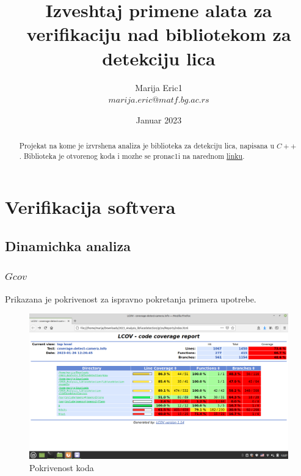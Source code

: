 \documentclass{article}
\title{Izveshtaj primene alata za verifikaciju nad bibliotekom za detekciju lica}
\author{Marija Eric1 \\ 
$marija.eric@matf.bg.ac.rs$}
\date{Januar 2023}
\begin{document}
\maketitle
\renewcommand{\abstractname}{Sazhetak}
\renewcommand*\contentsname{Sadrzhaj}



\begin{abstract}
Projekat na kome je izvrshena analiza je biblioteka za detekciju lica, napisana u $C++$. Biblioteka je otvorenog koda i mozhe se pronac1i na narednom \href{https://github.com/ShiqiYu/libfacedetection}{linku}. 

\end{abstract}
\tableofcontents
\newpage

\section{Verifikacija softvera}
\subsection{Dinamichka analiza}
\subsubsection{$Gcov$}

Prikazana je pokrivenost za ispravno pokretanja primera upotrebe.

\begin{figure}[H]
    \centering
    \includegraphics[width=12cm]{img/gcov/gcovCoverageDetect.png}
    \caption{Pokrivenost koda }
    \label{covd:gcov}
\end{figure}

\end{document}

